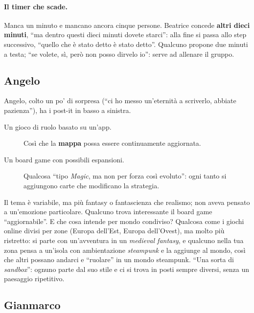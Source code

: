 \paragraph{Il timer che scade.} Manca un minuto e mancano ancora cinque persone.
Beatrice concede \textbf{altri dieci minuti}, ``ma dentro questi dieci minuti dovete
starci'': alla fine si passa allo step successivo, ``quello che è stato detto è stato
detto''. Qualcuno propone due minuti a testa; ``se volete, sì, però non posso
dirvelo io'': serve ad allenare il gruppo.

\subsection{Angelo}
\label{a7:sec:idee-angelo}

Angelo, colto un po' di sorpresa (``ci ho messo un'eternità a scriverlo, abbiate
pazienza''), ha i post-it in basso a sinistra.
\begin{description}
  \item[Un gioco di ruolo basato su un'app.] Così che la \textbf{mappa} possa essere
        continuamente aggiornata.
  \item[Un board game con possibili espansioni.] Qualcosa ``tipo \emph{Magic}, ma non
        per forza così evoluto'': ogni tanto si aggiungono carte che modificano la
        strategia.
\end{description}
Il tema è variabile, ma più fantasy o fantascienza che realismo; non aveva pensato a
un'emozione particolare. Qualcuno trova interessante il board game ``aggiornabile''.
E che cosa intende per mondo condiviso? Qualcosa come i giochi online divisi per zone
(Europa dell'Est, Europa dell'Ovest), ma molto più ristretto: si parte con
un'avventura in un \emph{medieval fantasy}, e qualcuno nella tua zona pensa a un'isola
con ambientazione \emph{steampunk} e la aggiunge al mondo, così che altri possano
andarci e ``ruolare'' in un mondo steampunk. ``Una sorta di \emph{sandbox}'':
ognuno parte dal suo stile e ci si trova in posti sempre diversi, senza un paesaggio
ripetitivo.

\subsection{Gianmarco}
\label{a7:sec:idee-gianmarco}

